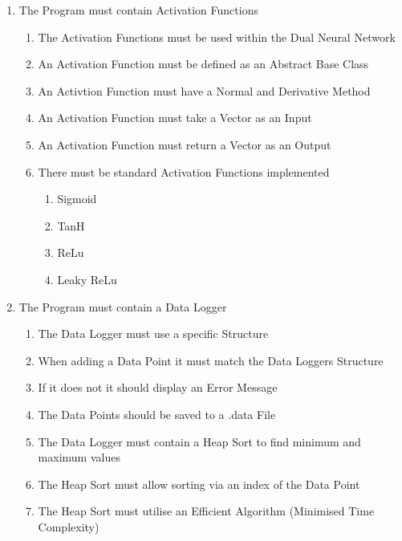 \begin{flushleft}
\begin{enumerate}
                \item The Program must contain Activation Functions
                \begin{enumerate}
                    \item The Activation Functions must be used within the Dual Neural Network
                    \item An Activation Function must be defined as an Abstract Base Class
                    \item An Activtion Function must have a Normal and Derivative Method
                    \item An Activation Function must take a Vector as an Input
                    \item An Activation Function must return a Vector as an Output
                    \item There must be standard Activation Functions implemented
                    \begin{enumerate}
                        \item Sigmoid
                        \item TanH
                        \item ReLu
                        \item Leaky ReLu
                    \end{enumerate}
                \end{enumerate}

                \item The Program must contain a Data Logger
                \begin{enumerate}
                    \item The Data Logger must use a specific Structure
                    \item When adding a Data Point it must match the Data Loggers Structure
                    \item If it does not it should display an Error Message
                    \item The Data Points should be saved to a .data File
                    \item The Data Logger must contain a Heap Sort to find minimum and maximum values
                    \item The Heap Sort must allow sorting via an index of the Data Point
                    \item The Heap Sort must utilise an Efficient Algorithm (Minimised Time Complexity)
                \end{enumerate}


\end{enumerate}
\end{flushleft}
